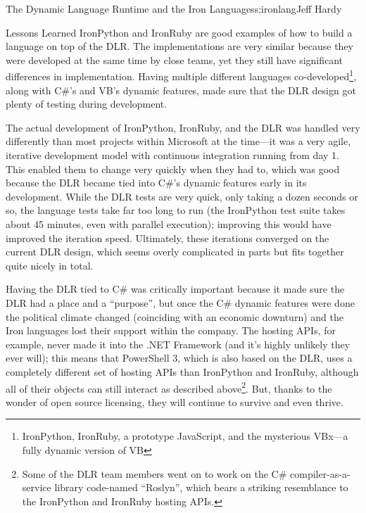 \begin{aosachapter}{The Dynamic Language Runtime and the Iron Languages}{s:ironlang}{Jeff Hardy}
\begin{aosasect1}{Lessons Learned}
IronPython and IronRuby are good examples of how to build a language on top of the DLR. The implementations are very similar because they were developed at the same time by close teams, yet they still have significant differences in implementation. Having multiple different languages co-developed\footnote{IronPython, IronRuby, a prototype JavaScript, and the mysterious VBx---a fully dynamic version of VB}, along with C\#'s and VB's dynamic features, made sure that the DLR design got plenty of testing during development.

The actual development of IronPython, IronRuby, and the DLR was handled very differently than most projects within Microsoft at the time---it was a very agile, iterative development model with continuous integration running from day 1. This enabled them to change very quickly when they had to, which was good because the DLR became tied into C\#'s dynamic features early in its development. While the DLR tests are very quick, only taking a dozen seconds or so, the language tests take far too long to run (the IronPython test suite takes about 45 minutes, even with parallel execution); improving this would have improved the iteration speed. Ultimately, these iterations converged on the current DLR design, which seems overly complicated in parts but fits together quite nicely in total.

Having the DLR tied to C\# was critically important because it made sure the DLR had a place and a ``purpose'', but once the C\# dynamic features were done the political climate changed (coinciding with an economic downturn) and the Iron languages lost their support within the company. The hosting APIs, for example, never made it into the .NET Framework (and it's highly unlikely they ever will); this means that PowerShell 3, which is also based on the DLR, uses a completely different set of hosting APIs than IronPython and IronRuby, although all of their objects can still interact as described above\footnote{Some of the DLR team members went on to work on the C\# compiler-as-a-service library code-named ``Roslyn'', which bears a striking resemblance to the IronPython and IronRuby hosting APIs.}. But, thanks to the wonder of open source licensing, they will continue to survive and even thrive.

\end{aosasect1}

\end{aosachapter}
